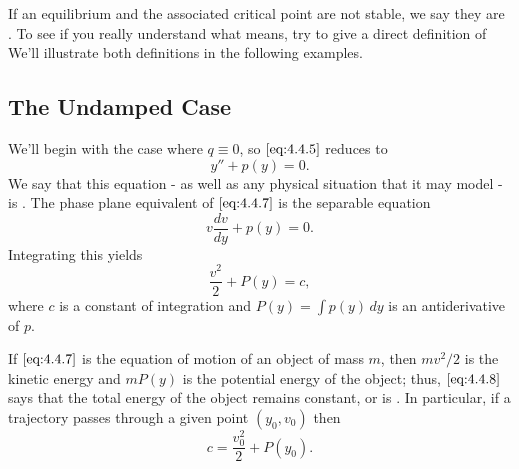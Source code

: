 \documentclass{ximera}
\begin{document}
\begin{center}
\end{center}

 
If an equilibrium and the associated critical point are not stable, we
say they are . To see if you really understand what
 means, try to give a direct definition of 
We'll illustrate both definitions in
the following examples.
 
 
\subsection*{The Undamped Case}
 
We'll begin with the case where $q\equiv0$, so  $\eqref{eq:4.4.5}$
reduces to
 \begin{equation}\label{eq:4.4.7}
y''+p(y)=0.
\end{equation}
We say that this equation - as well as any physical situation
that it may model - is .
The phase plane equivalent of $\eqref{eq:4.4.7}$ is  the
separable equation
$$
v\frac{dv}{dy}+p(y)=0.
$$
 Integrating this  yields
\begin{equation}\label{eq:4.4.8}
\frac{v^2}{2}+P(y)=c,
\end{equation}
where $c$ is a constant of integration and $P(y)=\int p(y)\,dy$ is an
antiderivative of $p$.
 
If $\eqref{eq:4.4.7}$ is the equation of motion of an object of
mass $m$, then
 $mv^2/2$ is the kinetic energy and $mP(y)$ is the
potential energy of the object;   thus, $\eqref{eq:4.4.8}$ says that the
total
energy of the object remains constant, or is . In
particular, if a trajectory passes through a given point $(y_0,v_0)$
then
$$
c=\frac{v_0^2}{2}+P(y_0).
$$
 
\end{document}

